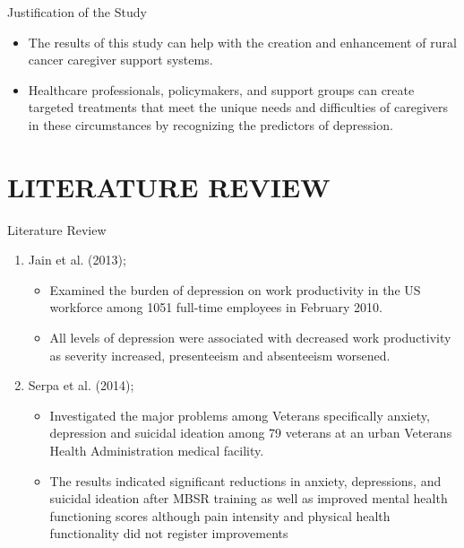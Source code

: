 \documentclass{beamer}
\newcounter{saveenumi}
\newcommand{\seti}{\setcounter{saveenumi}{\value{enumi}}}
\numberwithin{equation}{section}
\numberwithin{table}{section}
\begin{document}
\begin{frame}{Justification of the Study}
	\begin{itemize}
\item  The results of this study can help with the creation and enhancement of rural cancer caregiver support systems.
\vspace{0.6cm}
\item Healthcare professionals, policymakers, and support groups can create targeted treatments that meet the unique needs and difficulties of caregivers in these circumstances by recognizing the predictors of depression.
	\end{itemize}
\end{frame}
\section{LITERATURE REVIEW}
\begin{frame}{Literature Review}
\begin{enumerate}
	\item Jain et al. (2013);
	\begin{itemize}
	\item  Examined the burden of depression on work productivity in the US workforce among 1051 full-time employees in February 2010.
	\item All levels of depression were associated with decreased work productivity as severity increased, presenteeism and absenteeism worsened.
	\end{itemize}

\item Serpa et al. (2014);

\begin{itemize}
\item Investigated the major problems among Veterans specifically anxiety, depression and suicidal ideation among 79 veterans at an urban Veterans Health Administration medical facility. 
\item The results indicated significant reductions in anxiety, depressions, and  suicidal ideation after MBSR training as well as improved mental health functioning scores although pain intensity and physical health functionality did not register improvements
\end{itemize}
\seti
	\end{enumerate}
\end{frame}
\end{document}
